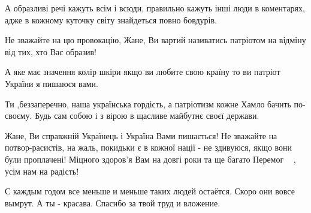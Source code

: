 \begin{itemize}
А образливі речі кажуть всім і всюди, правильно кажуть інші люди в коментарях,
адже в кожному куточку світу знайдеться повно бовдурів.

Не зважайте на цю провокацію, Жане, Ви вартий називатись патріотом на відміну
від тих, хто Вас образив!  💛💙


 

А яке має значення колір шкіри якщо ви любите свою країну то ви патріот України
я пишаюся вами.


 

Ти ,беззаперечно, наша українська гордість, а патріотизм кожне Хамло бачить
по-своєму. Будь сам собою і з вірою в щасливе майбутнє своєї держави.

 

Жане, Ви справжній Українець і Україна Вами пишається! Не зважайте на
потвор-расистів, на жаль, покидьки є в кожної нації - не здивуюся, якщо вони
були проплачені! Міцного здоров'я Вам на довгі роки та ще багато Перемог
🥇🥇🥇, усім нам на радість! 💙💛


 

С каждым годом все меньше и меньше таких людей остаётся. Скоро они вовсе
вымрут. А ты - красава. Спасибо за твой труд и вложение.

\begin{itemize}
 

\end{itemize}
\end{itemize}
